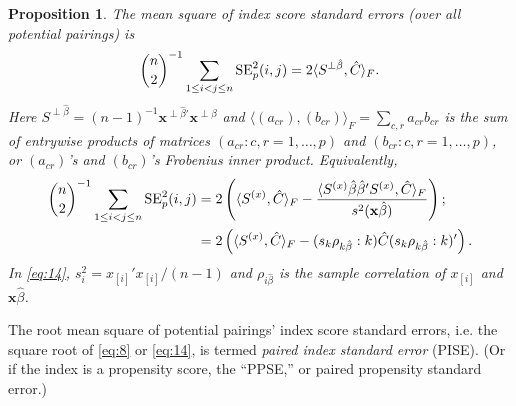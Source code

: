 \documentclass{article}
\newtheorem{prop}{Proposition}
\theoremstyle{remark}
\begin{document}
\begin{prop} \label{prop:rmsSEp}
 The mean square of index score standard errors (over all potential pairings) is 
 \begin{equation}
   \label{eq:12}
 {n \choose 2}^{-1}\sum_{1\leq i< j \leq n} \mathrm{SE}_{p}^{2}(i,j) = 
   2 {\fip{S^{\perp\hat\beta}
}{ \hat{C}}}.%
 \end{equation}
Here $S^{\perp\hat\beta} = (n-1)^{-1}\mathbf{x}^{\perp \hat\beta \prime} \mathbf{x}^{\perp \hat\beta}$ and $\langle (a_{cr}), (b_{cr}) \rangle_{F} = \sum_{c,r } a_{cr}b_{cr}$ is the sum of entrywise products of matrices $(a_{cr}: c,r=1,\ldots, p)$ and $(b_{cr}: c,r=1, \ldots, p)$, or $(a_{cr})$'s and  $(b_{cr})$'s Frobenius inner product.  Equivalently, 
\begin{align}
\label{eq:8}
{n \choose 2}^{-1}\sum_{1\leq i< j \leq n} \mathrm{SE}_{p}^{2}(i,j) &=  2\left(\fip{S^{(x)}}{ \hat{C}} - %
\frac{\fip{S^{(x)}\hat\beta\hat{\beta}'S^{(x)}}{ \hat{C}}}{s^{2}(\mathbf{x}\hat\beta)} \right);\\
&= 2\left( \fip{S^{(x)}}{\hat{C}} - (s_{k} \rho_{k \hat\beta}: k ) \hat{C} (s_{k} \rho_{k \hat\beta}:k)' \right).  \label{eq:14}
\end{align}
In \eqref{eq:14}, $s_{i}^{2} = x_{[i]}'x_{[i]}/(n-1)$ and $\rho_{i\hat\beta} $ %
 is the sample correlation of $x_{[i]}$ and $\mathbf{x}\hat\beta$. 
\end{prop}

The root mean square of potential pairings' index score standard
errors, i.e. the square root of \eqref{eq:8} or \eqref{eq:14}, is
termed \textit{paired index standard error} (PISE).  (Or if the index is a
propensity score, the ``PPSE,'' or paired propensity standard error.)
\end{document}
